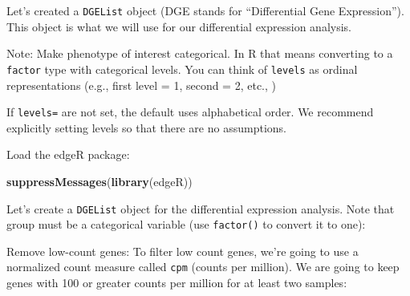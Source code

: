 \documentclass[
]{book}
\newenvironment{Shaded}{\begin{snugshade}}{\end{snugshade}}
\newcommand{\AttributeTok}[1]{\textcolor[rgb]{0.13,0.29,0.53}{#1}}
\newcommand{\FunctionTok}[1]{\textcolor[rgb]{0.13,0.29,0.53}{\textbf{#1}}}
\newcommand{\NormalTok}[1]{#1}
\newcommand{\OtherTok}[1]{\textcolor[rgb]{0.56,0.35,0.01}{#1}}
\newcommand{\SpecialCharTok}[1]{\textcolor[rgb]{0.81,0.36,0.00}{\textbf{#1}}}
\begin{document}
Let's created a \texttt{DGEList} object (DGE stands for ``Differential Gene Expression''). This object is what we will use for our differential expression analysis.

Note: Make phenotype of interest categorical. In R that means converting to a \texttt{factor} type with categorical levels. You can think of \texttt{levels} as ordinal representations (e.g., first level = 1, second = 2, etc., )

If \texttt{levels=} are not set, the default uses alphabetical order. We recommend explicitly setting levels so that there are no assumptions.

Load the edgeR package:

\begin{Shaded}
\begin{Highlighting}[]
\FunctionTok{suppressMessages}\NormalTok{(}\FunctionTok{library}\NormalTok{(edgeR))}
\end{Highlighting}
\end{Shaded}

Let's create a \texttt{DGEList} object for the differential expression analysis. Note that group must be a categorical variable (use \texttt{factor()} to convert it to one):

\begin{Shaded}
\end{Shaded}

Remove low-count genes: To filter low count genes, we're going to use a normalized count measure called \texttt{cpm} (counts per million). We are going to keep genes with 100 or greater counts per million for at least two samples:

\begin{Shaded}
\end{Shaded}
\end{document}
